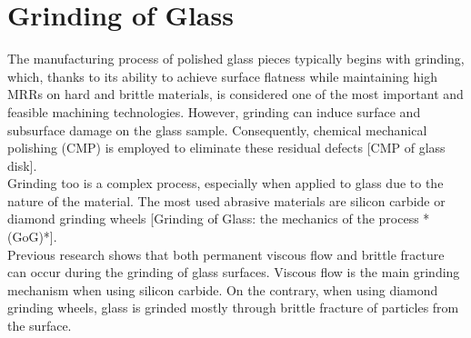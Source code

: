 \label{ch:experimental_techniques}

\section{Grinding of Glass}
\label{sec:grinding_glass}

The manufacturing process of polished glass pieces typically begins with grinding, which, thanks to its ability to achieve surface flatness while maintaining high MRRs on hard and brittle materials, is considered one of the most important and feasible machining technologies. However, grinding can induce surface and subsurface damage on the glass sample. Consequently, chemical mechanical polishing (CMP) is employed to eliminate these residual defects [CMP of glass disk].
\\
Grinding too is a complex process, especially when applied to glass due to the nature of the material. The most used abrasive materials are silicon carbide or diamond grinding wheels [Grinding of Glass: the mechanics of the process *(GoG)*]. 
\\
Previous research shows that both permanent viscous flow and brittle fracture can occur during the grinding of glass surfaces. 
Viscous flow is the main grinding mechanism when using silicon carbide. On the contrary, when using diamond grinding wheels, glass is grinded mostly through brittle fracture of particles from the surface.

